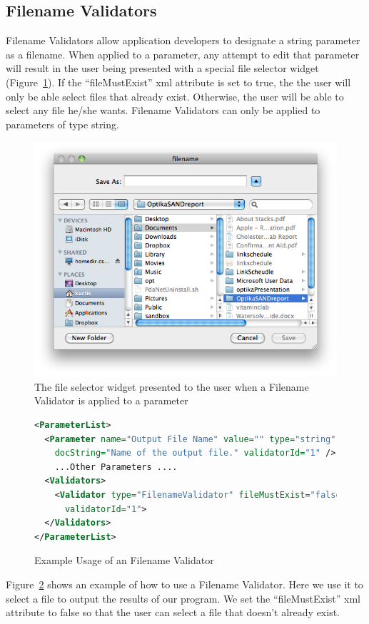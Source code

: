 \subsection{Filename Validators}
Filename Validators allow application developers to designate a string parameter as a filename. When applied to a parameter,
any attempt to edit that parameter will result in the user being presented with a special file selector widget (Figure~\ref{fileSelectorWidget}). If the 
``fileMustExist'' xml attribute is set to true, the the user will only be able select files that already exist. Otherwise, the user will be able
to select any file he/she wants. Filename Validators can only be applied to parameters of type string. \begin{figure}
\centering
\includegraphics[scale=0.5]{graphics/fileWidget}
\caption{The file selector widget presented to the user when a Filename Validator is applied to a parameter}
\label{fileSelectorWidget}
\end{figure}
\begin{figure}
\centering
\begin{lstlisting}[language=XML]
<ParameterList>
  <Parameter name="Output File Name" value="" type="string" 
    docString="Name of the output file." validatorId="1" />
    ...Other Parameters ....
  <Validators>
    <Validator type="FilenameValidator" fileMustExist="false" 
      validatorId="1">
  </Validators>
</ParameterList>
\end{lstlisting}
\caption{Example Usage of an Filename Validator}
\label{filenamevalidatorXML}
\end{figure}
Figure~\ref{filenamevalidatorXML} shows an example of how to use a Filename Validator. Here we use it to select a file to output the results
of our program. We set the ``fileMustExist'' xml attribute to false so that the user can select a file that doesn't already exist.

